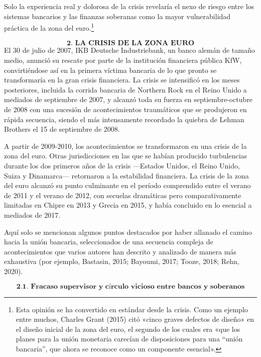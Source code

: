 \documentclass[10pt,a4paper]{article}
\begin{document}
{Solo la experiencia real y dolorosa de la crisis revelaría el nexo de riesgo entre los sistemas bancarios y las finanzas soberanas como la mayor vulnerabilidad práctica de la zona del euro.\footnote{%
    Esta opinión se ha convertido en estándar desde la crisis. Como un ejemplo entre muchos, Charles Grant (2015) citó «cinco graves defectos de diseño» en el diseño inicial de la zona del euro, el segundo de los cuales era «que los planes para la unión monetaria carecían de disposiciones para una “unión bancaria”, que ahora se reconoce como un componente esencial».
}

$$\textbf{2. LA CRISIS DE LA ZONA EURO}$$
El 30 de julio de 2007, IKB Deutsche Industriebank, un banco alemán de tamaño medio, anunció su rescate por parte de la institución financiera pública KfW, convirtiéndose así en la primera víctima bancaria de lo que pronto se transformaría en la gran crisis financiera. La crisis se intensificó en los meses posteriores, incluida la corrida bancaria de Northern Rock en el Reino Unido a mediados de septiembre de 2007, y alcanzó toda su fuerza en septiembre-octubre de 2008 con una sucesión de acontecimientos traumáticos que se produjeron en rápida secuencia, siendo el más intensamente recordado la quiebra de Lehman Brothers el 15 de septiembre de 2008.

A partir de 2009-2010, los acontecimientos se transformaron en una crisis de la zona del euro. Otras jurisdicciones en las que se habían producido turbulencias durante los dos primeros años de la crisis —Estados Unidos, el Reino Unido, Suiza y Dinamarca— retornaron a la estabilidad financiera. La crisis de la zona del euro alcanzó su punto culminante en el período comprendido entre el verano de 2011 y el verano de 2012, con secuelas dramáticas pero comparativamente limitadas en Chipre en 2013 y Grecia en 2015, y había concluido en lo esencial a mediados de 2017.

Aquí solo se mencionan algunos puntos destacados por haber allanado el camino hacia la unión bancaria, seleccionados de una secuencia compleja de acontecimientos que varios autores han descrito y analizado de manera más exhaustiva (por ejemplo, Bastasin, 2015; Bayoumi, 2017; Tooze, 2018; Rehn, 2020).


$$\textbf{2.1. Fracaso supervisor y círculo vicioso entre bancos y soberanos}$$

}
\end{document}
